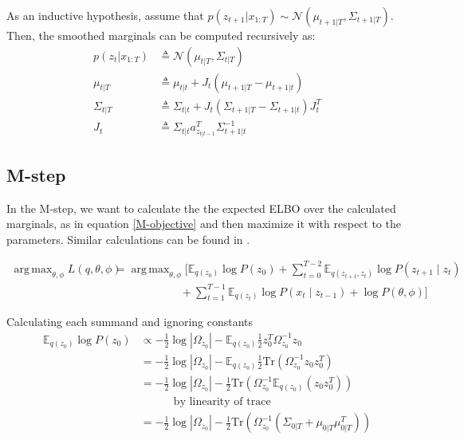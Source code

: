 \documentclass[11pt, reqno]{article}
\DeclareMathOperator*{\argmax}{arg\,max}
\numberwithin{equation}{section}
\begin{document}
As an inductive hypothesis, assume that $p(z_{t+1} | x_{1:T}) \sim \mathcal{N}(\mu_{t+1|T}, \Sigma_{t+1|T})$. Then, the smoothed marginals can be computed recursively as:
\begin{align*}
p(z_t | x_{1:T}) &\triangleq \mathcal{N}(\mu_{t|T}, \Sigma_{t|T}) \\
\mu_{t|T} &\triangleq \mu_{t|t} + J_t \left(\mu_{t+1|T}  - \mu_{t+1|t} \right) \\
\Sigma_{t|T} &\triangleq \Sigma_{t|t} + J_t \left(\Sigma_{t+1|T} - \Sigma_{t+1|t} \right) J_t^T \\
J_t &\triangleq \Sigma_{t|t} a^T_{z_{t|t-1}}\Sigma^{-1}_{t+1|t} 
\end{align*}


\subsection{M-step}
In the M-step, we want to calculate the the expected ELBO over the calculated marginals, as in equation \ref{M-objective} and then maximize it with respect to the parameters. Similar calculations can be found in \cite{Shumway1982}.

\begin{align*}
\argmax_{\theta, \phi} L(q,\theta,\phi) &= \argmax_{\theta, \phi} \Bigg[\mathbb{E}_{q(z_0)} \log P(z_0) + \sum_{t=0}^{T-2} \mathbb{E}_{q(z_{t+1}, z_t)} \log P(z_{t+1} \mid z_t) \\
&\hspace{6em} + \sum_{t=1}^{T-1} \mathbb{E}_{q(z_t)} \log P(x_t \mid z_{t-1})  + \log P(\theta, \phi) \Bigg]
\end{align*}

Calculating each summand and ignoring constants
\begin{align*}
\mathbb{E}_{q(z_0)} \log P(z_0) &\propto -\frac{1}{2} \log |\Omega_{z_0}|  - \mathbb{E}_{q(z_0)}\frac{1}{2} z_0^T\Omega_{z_0}^{-1}z_0 \\
&=  -\frac{1}{2} \log |\Omega_{z_0}| - \mathbb{E}_{q(z_0)}\frac{1}{2} \mathrm{Tr}(\Omega_{z_0}^{-1}z_0z_0^T) \\
&=  -\frac{1}{2} \log |\Omega_{z_0}| - \frac{1}{2} \mathrm{Tr}(\Omega_{z_0}^{-1}\mathbb{E}_{q(z_0)} (z_0z_0^T)) \\
& \hspace{3em} \text{by linearity of trace} \\
&=  -\frac{1}{2} \log |\Omega_{z_0}| - \frac{1}{2} \mathrm{Tr}\left(\Omega_{z_0}^{-1}\left( \Sigma_{0|T} + \mu_{0|T}\mu_{0|T}^T \right)\right)
\end{align*}
\end{document}
